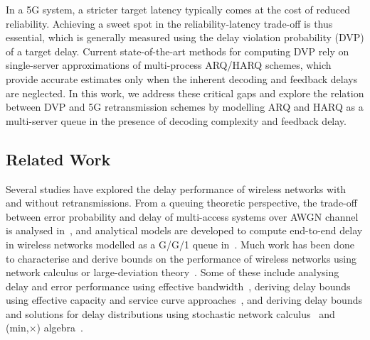 In a 5G system, a stricter target latency typically comes at the cost of reduced reliability.
Achieving a sweet spot in the reliability-latency trade-off is thus essential, which is generally measured using the delay violation probability (DVP) of a target delay. 
Current state-of-the-art methods for computing DVP rely on single-server approximations of multi-process ARQ/HARQ schemes, which provide accurate estimates only when the inherent decoding and feedback delays are neglected. 
In this work, we address these critical gaps and explore the relation between DVP and 5G retransmission schemes by modelling ARQ and HARQ as a multi-server queue in the presence of decoding complexity and feedback delay. 



\subsection{Related Work}
Several studies have explored the delay performance of wireless networks with and without retransmissions.
From a queuing theoretic perspective, the trade-off between error probability and delay of multi-access systems over AWGN channel is analysed in~\cite{Telatar1995}, and analytical models are developed to compute end-to-end delay in wireless networks modelled as a G/G/1 queue in~\cite{bisnik2006queuing}.
Much work has been done to characterise and derive bounds on the performance of wireless networks using network calculus or large-deviation theory~\cite{devassy2019reliable,Zubaidi2016,yeh2012fundamental,petreska2019bound}.
Some of these include analysing delay and error performance using effective bandwidth~\cite{chang1995EB,hassan2004markov}, 
deriving delay bounds using effective capacity and service curve approaches~\cite{wu2003effectiveCap,fidler2006wlc15},
and deriving delay bounds and solutions for delay distributions using stochastic network calculus~\cite{jiang2008SNC,Ciucu2010} and (min,×) algebra~\cite{Zubaidi2016}.


